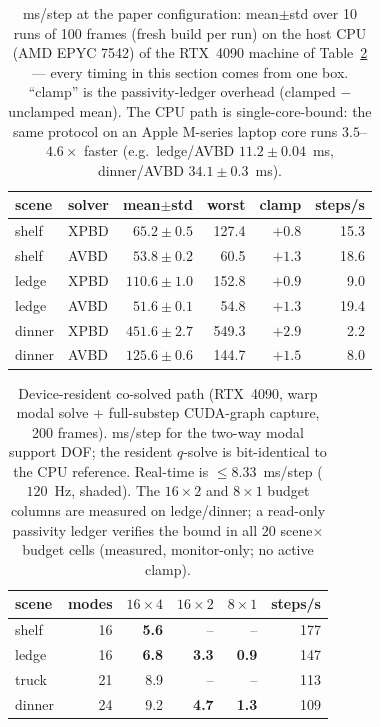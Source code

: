 \begin{table}[t]\centering\footnotesize
\setlength{\tabcolsep}{3.2pt}
\caption{ms/step at the paper configuration: mean$\pm$std over 10 runs of 100
frames (fresh build per run) on the host CPU (AMD EPYC 7542) of the RTX~4090
machine of Table~\ref{tab:perfdev} --- every timing in this section comes
from one box. ``clamp'' is the passivity-ledger overhead (clamped $-$
unclamped mean). The CPU path is single-core-bound: the same protocol on an
Apple M-series laptop core runs $3.5$--$4.6\times$ faster (e.g.\ ledge/AVBD
$11.2\pm0.04$~ms, dinner/AVBD $34.1\pm0.3$~ms).}
\label{tab:perf}
\begin{tabular}{llrrrr}
\toprule
scene & solver & mean$\pm$std & worst & clamp & steps/s \\
\midrule
shelf  & XPBD & $65.2\pm0.5$  & 127.4 & $+0.8$ & 15.3 \\
shelf  & AVBD & $53.8\pm0.2$  & 60.5  & $+1.3$ & 18.6 \\
ledge  & XPBD & $110.6\pm1.0$ & 152.8 & $+0.9$ & 9.0 \\
ledge  & AVBD & $51.6\pm0.1$  & 54.8  & $+1.3$ & 19.4 \\
dinner & XPBD & $451.6\pm2.7$ & 549.3 & $+2.9$ & 2.2 \\
dinner & AVBD & $125.6\pm0.6$ & 144.7 & $+1.5$ & 8.0 \\
\bottomrule
\end{tabular}
\end{table}

\begin{table}[t]\centering\footnotesize
\setlength{\tabcolsep}{5pt}
\caption{Device-resident co-solved path (RTX~4090, warp modal solve +
full-substep CUDA-graph capture, 200 frames). ms/step for the two-way modal
support DOF; the resident $q$-solve is bit-identical to the CPU reference.
Real-time is ${\le}8.33$~ms/step ($120$~Hz, shaded). The $16{\times}2$ and
$8{\times}1$ budget columns are measured on ledge/dinner; a read-only
passivity ledger verifies the bound in all $20$ scene$\times$budget cells
(measured, monitor-only; no active clamp).}
\label{tab:perfdev}
\begin{tabular}{lrrrrr}
\toprule
scene & modes & $16{\times}4$ & $16{\times}2$ & $8{\times}1$ & steps/s \\
\midrule
shelf  & 16 & \textbf{5.6} & --  & --  & 177 \\
ledge  & 16 & \textbf{6.8} & \textbf{3.3} & \textbf{0.9} & 147 \\
truck  & 21 & 8.9 & --  & --  & 113 \\
dinner & 24 & 9.2 & \textbf{4.7} & \textbf{1.3} & 109 \\
\bottomrule
\end{tabular}
\end{table}

